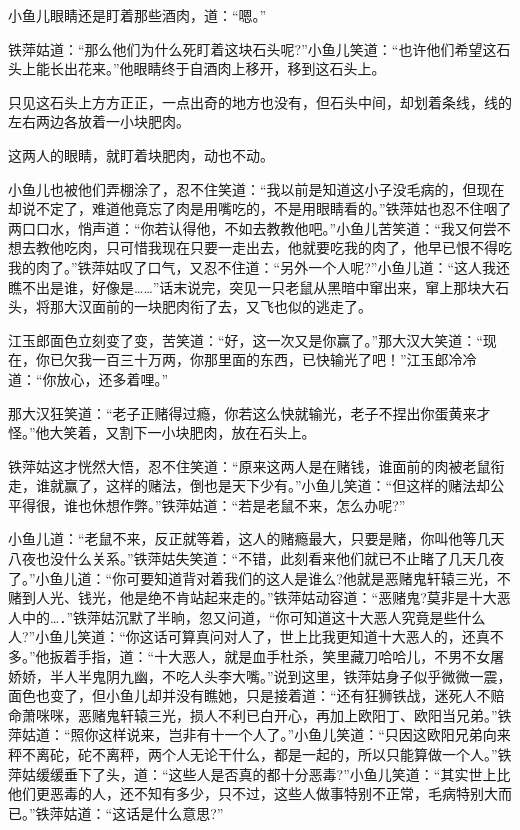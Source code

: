 \documentclass[12pt,oneside]{book}
\begin{document}
小鱼儿眼睛还是盯着那些酒肉，道：``嗯。''

铁萍姑道：``那么他们为什么死盯着这块石头呢?''小鱼儿笑道：``也许他们希望这石头上能长出花来。''他眼睛终于自酒肉上移开，移到这石头上。

只见这石头上方方正正，一点出奇的地方也没有，但石头中间，却划着条线，线的左右两边各放着一小块肥肉。

这两人的眼睛，就盯着块肥肉，动也不动。

小鱼儿也被他们弄棚涂了，忍不住笑道：``我以前是知道这小子没毛病的，但现在却说不定了，难道他竟忘了肉是用嘴吃的，不是用眼睛看的。''铁萍姑也忍不住咽了两口口水，悄声道：``你若认得他，不如去教教他吧。''小鱼儿苦笑道：``我又何尝不想去教他吃肉，只可惜我现在只要一走出去，他就要吃我的肉了，他早已恨不得吃我的肉了。''铁萍姑叹了口气，又忍不住道：``另外一个人呢?''小鱼儿道：``这人我还瞧不出是谁，好像是\ldots\ldots{}''话末说完，突见一只老鼠从黑暗中窜出来，窜上那块大石头，将那大汉面前的一块肥肉衔了去，又飞也似的逃走了。

江玉郎面色立刻变了变，苦笑道：``好，这一次又是你赢了。''那大汉大笑道：``现在，你已欠我一百三十万两，你那里面的东西，已快输光了吧！''江玉郎冷冷道：``你放心，还多着哩。''

那大汉狂笑道：``老子正赌得过瘾，你若这么快就输光，老子不捏出你蛋黄来才怪。''他大笑着，又割下一小块肥肉，放在石头上。

铁萍姑这才恍然大悟，忍不住笑道：``原来这两人是在赌钱，谁面前的肉被老鼠衔走，谁就赢了，这样的赌法，倒也是天下少有。''小鱼儿笑道：``但这样的赌法却公平得很，谁也休想作弊。''铁萍姑道：``若是老鼠不来，怎么办呢?''

小鱼儿道：``老鼠不来，反正就等着，这人的赌瘾最大，只要是赌，你叫他等几天八夜也没什么关系。''铁萍姑失笑道：``不错，此刻看来他们就已不止睹了几天几夜了。''小鱼儿道：``你可要知道背对着我们的这人是谁么?他就是恶赌鬼轩辕三光，不赌到人光、钱光，他是绝不肯站起来走的。''铁萍姑动容道：``恶赌鬼?莫非是十大恶人中的\ldots．''铁萍姑沉默了半晌，忽又问道，``你可知道这十大恶人究竟是些什么人?''小鱼儿笑道：``你这话可算真问对人了，世上比我更知道十大恶人的，还真不多。''他扳着手指，道：``十大恶人，就是血手杜杀，笑里藏刀哈哈儿，不男不女屠娇娇，半人半鬼阴九幽，不吃人头李大嘴。''说到这里，铁萍姑身子似乎微微一震，面色也变了，但小鱼儿却并没有瞧她，只是接着道：``还有狂狮铁战，迷死人不赔命萧咪咪，恶赌鬼轩辕三光，损人不利已白开心，再加上欧阳丁、欧阳当兄弟。''铁萍姑道：``照你这样说来，岂非有十一个人了。''小鱼儿笑道：``只因这欧阳兄弟向来秤不离砣，砣不离秤，两个人无论干什么，都是一起的，所以只能算做一个人。''铁萍姑缓缓垂下了头，道：``这些人是否真的都十分恶毒?''小鱼儿笑道：``其实世上比他们更恶毒的人，还不知有多少，只不过，这些人做事特别不正常，毛病特别大而已。''铁萍姑道：``这话是什么意思?''
\end{document}
